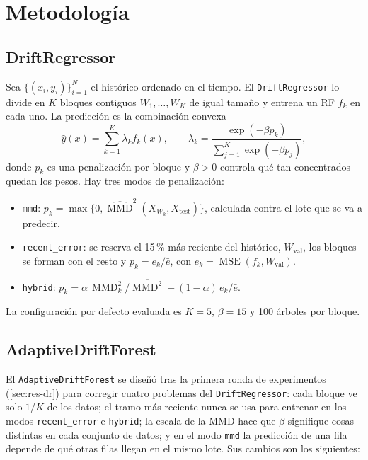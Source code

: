 \documentclass[11pt,a4paper]{article}
\newcommand{\MMD}{\operatorname{MMD}}
\newcommand{\MSE}{\operatorname{MSE}}
\begin{document}
\section{Metodología}\label{sec:metodo}

\subsection{DriftRegressor}\label{sec:dr}

Sea $\{(x_i,y_i)\}_{i=1}^{N}$ el histórico ordenado en el tiempo. El \texttt{DriftRegressor} lo
divide en $K$ bloques contiguos $W_1,\dots,W_K$ de igual tamaño y entrena un RF $f_k$ en cada uno. La
predicción es la combinación convexa
\begin{equation}\label{eq:softmax}
\hat y(x) = \sum_{k=1}^{K}\lambda_k f_k(x),\qquad
\lambda_k = \frac{\exp(-\beta p_k)}{\sum_{j=1}^{K}\exp(-\beta p_j)},
\end{equation}
donde $p_k$ es una penalización por bloque y $\beta>0$ controla qué tan concentrados quedan los pesos.
Hay tres modos de penalización:
\begin{itemize}
  \item \texttt{mmd}: $p_k=\max\{0,\widehat{\MMD}^2(X_{W_k},X_{\text{test}})\}$, calculada contra el
  lote que se va a predecir.
  \item \texttt{recent\_error}: se reserva el 15\,\% más reciente del histórico, $W_{\text{val}}$, los
  bloques se forman con el resto y $p_k = e_k/\bar e$, con $e_k=\MSE(f_k,W_{\text{val}})$.
  \item \texttt{hybrid}: $p_k = \alpha\,\MMD^2_k/\overline{\MMD^2} + (1-\alpha)\,e_k/\bar e$.
\end{itemize}
La configuración por defecto evaluada es $K=5$, $\beta=15$ y 100 árboles por bloque.

\subsection{AdaptiveDriftForest}\label{sec:adf}

El \texttt{AdaptiveDriftForest} se diseñó tras la primera ronda de experimentos (\cref{sec:res-dr})
para corregir cuatro problemas del \texttt{DriftRegressor}: cada bloque ve solo $1/K$ de los datos;
el tramo más reciente nunca se usa para entrenar en los modos \texttt{recent\_error} e
\texttt{hybrid}; la escala de la MMD hace que $\beta$ signifique cosas distintas en cada conjunto de
datos; y en el modo \texttt{mmd} la predicción de una fila depende de qué otras filas llegan en el
mismo lote. Sus cambios son los siguientes:
\end{document}
